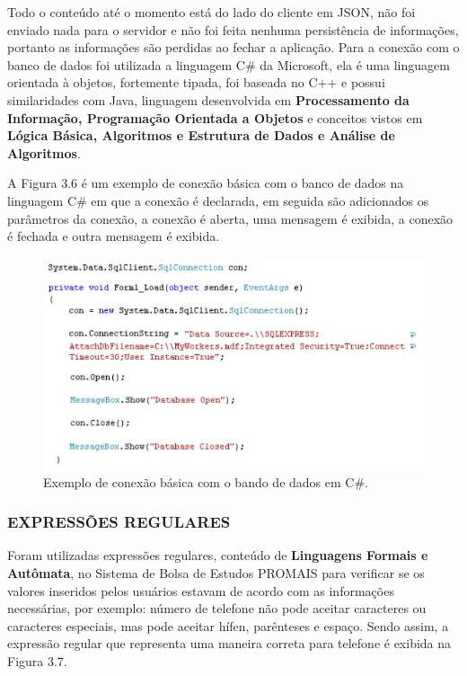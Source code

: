 \documentclass[
  12pt,				%
  openany,
  oneside,
  a4paper,			%
  english,			%
  brazil
]{article}
\numberwithin{figure}{section}
\numberwithin{table}{section}
\begin{document}
Todo o conteúdo até o momento está do lado do cliente em JSON, não foi enviado nada para o servidor e não foi feita nenhuma persistência de informações, portanto as informações são perdidas ao fechar a aplicação. Para a conexão com o banco de dados foi utilizada a linguagem C\# da Microsoft, ela é uma linguagem orientada à objetos, fortemente tipada, foi baseada no C++ e possui similaridades com Java, linguagem desenvolvida em \textbf{Processamento da Informação, Programação Orientada a Objetos} e conceitos vistos em \textbf{Lógica Básica, Algoritmos e Estrutura de Dados e Análise de Algoritmos}.

A Figura 3.6 é um exemplo de conexão básica com o banco de dados na linguagem C\#
em que a conexão é declarada, em seguida são adicionados os parâmetros da conexão, a conexão é aberta, uma mensagem é exibida, a conexão é fechada e outra mensagem é exibida.

\begin{figure}[!htb]
\centering
\includegraphics[width=1\textwidth]{figura36}
\caption{Exemplo de conexão básica com o bando de dados em C\#.}
\end{figure}



\subsubsection{EXPRESSÕES REGULARES}

Foram utilizadas expressões regulares, conteúdo de \textbf{Linguagens Formais e Autômata},
no Sistema de Bolsa de Estudos PROMAIS para verificar se os valores inseridos pelos usuários estavam de acordo com as informações necessárias, por exemplo: número de telefone não pode aceitar caracteres ou caracteres especiais, mas pode aceitar hífen, parênteses e espaço. Sendo assim, a expressão regular que representa uma maneira correta para telefone é exibida na Figura 3.7.
\end{document}
